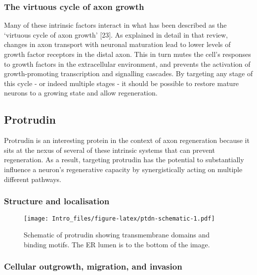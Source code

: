 \documentclass[
  12pt,
  a4paper,
]{article}
\begin{document}
\hypertarget{the-virtuous-cycle-of-axon-growth}{%
\subsubsection{The virtuous cycle of axon
growth}\label{the-virtuous-cycle-of-axon-growth}}

Many of these intrinsic factors interact in what has been described as
the `virtuous cycle of axon growth' {[}23{]}. As explained in detail in
that review, changes in axon transport with neuronal maturation lead to
lower levels of growth factor receptors in the distal axon. This in turn
mutes the cell's responses to growth factors in the extracellular
environment, and prevents the activation of growth-promoting
transcription and signalling cascades. By targeting any stage of this
cycle - or indeed multiple stages - it should be possible to restore
mature neurons to a growing state and allow regeneration.

\hypertarget{protrudin}{%
\subsection{Protrudin}\label{protrudin}}

Protrudin is an interesting protein in the context of axon regeneration
because it sits at the nexus of several of these intrinsic systems that
can prevent regeneration. As a result, targeting protrudin has the
potential to substantially influence a neuron's regenerative capacity by
synergistically acting on multiple different pathways.

\hypertarget{structure-and-localisation}{%
\subsubsection{Structure and
localisation}\label{structure-and-localisation}}

\begin{figure}
\centering
\texttt{[image: Intro\_files/figure-latex/ptdn-schematic-1.pdf]}
\caption{Schematic of protrudin showing transmembrane domains and
binding motifs. The ER lumen is to the bottom of the image.}
\end{figure}

\hypertarget{cellular-outgrowth-migration-and-invasion}{%
\subsubsection{Cellular outgrowth, migration, and
invasion}\label{cellular-outgrowth-migration-and-invasion}}
\end{document}
